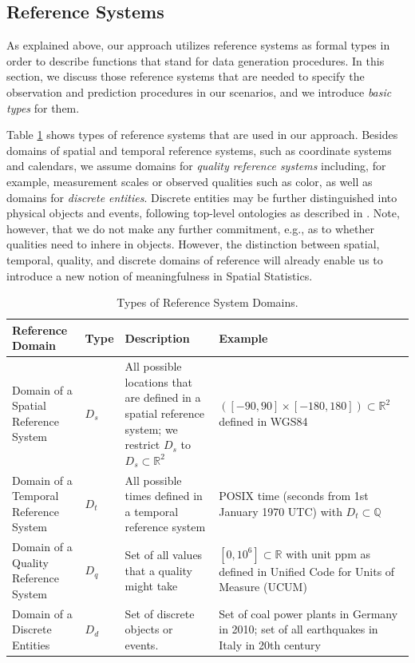 \documentclass[final,authoryear,1p,times]{elsarticle}
\begin{document}
\subsection{Reference Systems}
\label{refSystems}

As explained above, our approach utilizes reference systems as formal types in order to describe functions that stand for data generation procedures. In this section, we discuss those reference systems that are needed to specify the observation and prediction procedures in our scenarios, and we introduce \textit{basic types} for them.
  
Table \ref{refsyst} shows types of reference systems that are used in our approach.  Besides domains of spatial and temporal reference systems, such as coordinate systems and calendars, we assume domains for \textit{quality reference systems} including, for example, measurement scales or observed qualities such as color, as well as domains for \textit{discrete entities}. Discrete entities may be further distinguished into physical objects and events, following top-level ontologies as described in \citep{Gangemi2003}. Note, however, that we do not make any further commitment, e.g., as to whether qualities need to inhere in objects. However, the distinction between spatial, temporal, quality, and discrete domains of reference will already enable us to introduce a new notion of meaningfulness in Spatial Statistics. 

 \begin{table}[h]
\caption{Types of Reference System Domains.}
\label{refsyst}
\begin{tabular}[h]{|p{2.5cm}|p{1cm}|p{4cm}|p{4.2cm}|}
			\hline
			\textbf{Reference Domain} & \textbf{Type} & \textbf{Description} & \textbf{Example} \\
			\hline
			 Domain of a Spatial Reference System & $D_s$ & All possible locations that are defined in a spatial reference system; we restrict $D_s$ to $D_s \subset \mathbb{R}^2$ & $([-90,90] \times [-180,180]) \subset \mathbb{R}^2$ defined in WGS84\\
			 Domain of a Temporal Reference System & $D_t$ & All possible times defined in a temporal reference system & POSIX time (seconds from  1st January 1970 UTC) with $D_t \subset \mathbb{Q}$\\
			 Domain of a Quality Reference System & $D_q$ & Set of all values that a quality might take & $[0,10^6] \subset \mathbb{R}$ with unit ppm as defined in Unified Code for Units of Measure (UCUM) \\
			 Domain of a Discrete Entities & $D_d$ & Set of discrete objects or events. & Set of coal power plants in Germany in 2010; set of all earthquakes in Italy in 20th century\\
			\hline
\end{tabular}
\end{table}
\end{document}
